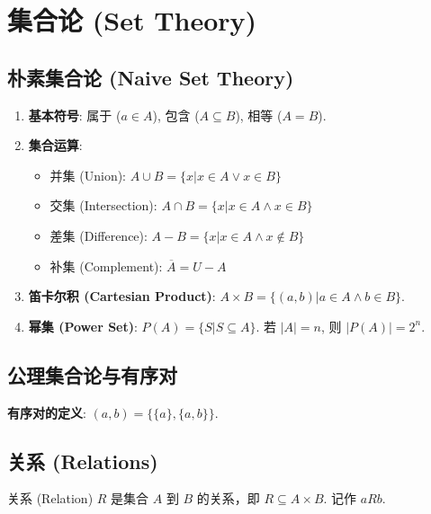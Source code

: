 \documentclass[a4paper,12pt]{ctexart}
\begin{document}
\newpage

\section{集合论 (Set Theory)}

\subsection{朴素集合论 (Naive Set Theory)}

\begin{enumerate}
    \item \textbf{基本符号}: 属于 ($a \in A$), 包含 ($A \subseteq B$), 相等 ($A=B$).
    \item \textbf{集合运算}:
    \begin{itemize}
        \item 并集 (Union): $A \cup B = \{ x | x \in A \lor x \in B \}$
        \item 交集 (Intersection): $A \cap B = \{ x | x \in A \land x \in B \}$
        \item 差集 (Difference): $A - B = \{ x | x \in A \land x \notin B \}$
        \item 补集 (Complement): $\overline{A} = U - A$
    \end{itemize}
    \item \textbf{笛卡尔积 (Cartesian Product)}: $A \times B = \{ (a, b) | a \in A \land b \in B \}$.
    \item \textbf{幂集 (Power Set)}: $P(A) = \{ S | S \subseteq A \}$. 若 $|A|=n$, 则 $|P(A)|=2^n$.
\end{enumerate}

\subsection{公理集合论与有序对}
\textbf{有序对的定义}: $(a, b) = \{ \{ a \}, \{ a, b \} \}$.

\subsection{关系 (Relations)}

\begin{mydef}{关系 (Relation)}{}
$R$ 是集合 $A$ 到 $B$ 的关系，即 $R \subseteq A \times B$. 记作 $aRb$.
\end{mydef}
\end{document}

